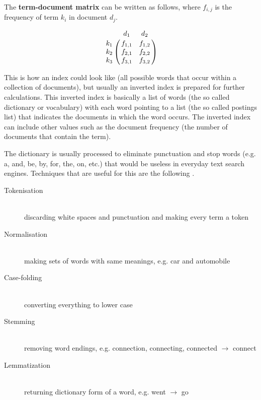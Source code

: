  \\
 

The \textbf{term-document matrix} can be written as follows, where $f_{i,j}$ is the frequency of term $k_{i}$ in document $d_{j}$.

\begin{equation}
  \bbordermatrix{~ & d_1 & d_2 \cr
                k_1 & f_{1,1} & f_{1,2} \cr
                k_2 & f_{2,1} & f_{2,2} \cr
                k_3 & f_{3,1} & f_{3,2} \cr}
\label{eq:tdm}
\end{equation}

This is how an index could look like (all possible words that occur within a collection of documents), but usually an inverted index is prepared for further calculations. This inverted index is basically a list of words (the so called dictionary or vocabulary) with each word pointing to a list (the so called postings list) that indicates the documents in which the word occurs. The inverted index can include other values such as the document frequency (the number of documents that contain the term).

The dictionary is usually processed to eliminate punctuation and stop words (e.g. a, and, be, by, for, the, on, etc.) that would be useless in everyday text search engines. Techniques that are useful for this are the following \citep[Ch.2]{Manning2009}.

\begin{description}
  \item [Tokenisation] \hfill \\
  discarding white spaces and punctuation and making every term a token
  \item [Normalisation] \hfill \\
  making sets of words with same meanings, e.g. car and automobile
  \item [Case-folding] \hfill \\
  converting everything to lower case
  \item [Stemming] \hfill \\
  removing word endings, e.g. connection, connecting, connected $\to$ connect
  \item [Lemmatization] \hfill \\
  returning dictionary form of a word, e.g. went $\to$ go
\end{description}


